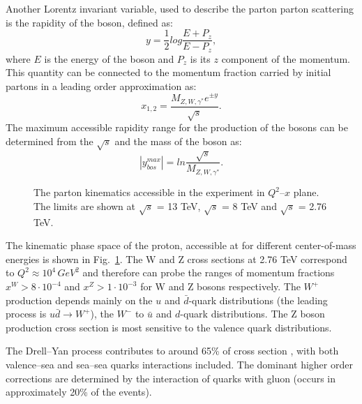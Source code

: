 Another Lorentz invariant variable, used to describe the parton parton scattering is the rapidity of the boson, defined as:
\begin{equation}
y = \frac{1}{2} log \frac{E+P_z}{E-P_z},
\end{equation}
where $E$ is the energy of the boson and $P_z$ is its $z$ component of the momentum.
This quantity can be connected to the momentum fraction carried by initial partons in a leading order approximation as:
\begin{equation}
x_{1,2}=\frac{M_{Z,W,\gamma^*}e^{\pm y}}{\sqrt{s}}.
\end{equation}
The maximum accessible rapidity range for the production of the bosons can be determined from the $\sqrt{s}$ and the mass of the boson as:
\begin{equation}
|y^{max}_{bos}| = ln \frac{\sqrt{s}}{M_{Z,W,\gamma^*}}.
\end{equation}

\begin{figure}[!tb]
\caption{The parton kinematics accessible in the \atlas experiment in $Q^2$--$x$ plane. The limits are shown at $\sqrt{s}$ = 13 TeV, $\sqrt{s}$ = 8 TeV and $\sqrt{s}$ = 2.76 TeV\cite{partKin}.}
\label{fig:PartKin}
\end{figure}

The kinematic phase space of the proton, accessible at \atlas for different center-of-mass energies is shown in Fig.~\ref{fig:PartKin}. The W and Z cross sections at 2.76 TeV correspond to $Q^2\approx 10^4\,  GeV^2$ and therefore can probe the ranges of momentum fractions $x^{W}>8\cdot 10^{-4}$ and $x^{Z}>1 \cdot 10^{-3}$  for W and Z bosons respectively.  The $W^{+}$ production depends mainly on the $u$ and $\bar{d}$-quark distributions (the leading process is $u\bar{d}\to W^+$), the $W^{-}$ to $\bar{u}$ and $d$-quark distributions. The Z boson production cross section is most sensitive to the valence quark distributions.

The Drell--Yan process contributes to around 65\% of cross section \cite{Ellis:318585}, with both valence--sea and sea--sea quarks interactions included. The dominant higher order corrections are determined by the interaction of quarks with gluon (occurs in approximately 20\% of the events). 


